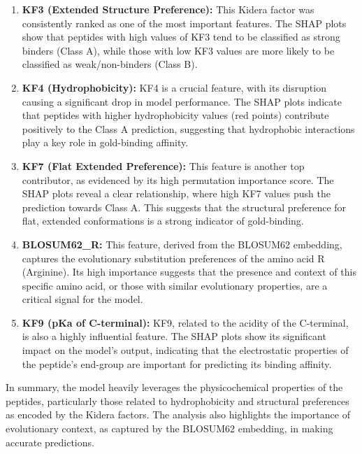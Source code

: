 \documentclass{article}
\begin{document}
\begin{enumerate}
    \item \textbf{KF3 (Extended Structure Preference):} This Kidera factor was consistently ranked as one of the most important features. The SHAP plots show that peptides with high values of KF3 tend to be classified as strong binders (Class A), while those with low KF3 values are more likely to be classified as weak/non-binders (Class B).
    \item \textbf{KF4 (Hydrophobicity):} KF4 is a crucial feature, with its disruption causing a significant drop in model performance. The SHAP plots indicate that peptides with higher hydrophobicity values (red points) contribute positively to the Class A prediction, suggesting that hydrophobic interactions play a key role in gold-binding affinity.
    \item \textbf{KF7 (Flat Extended Preference):} This feature is another top contributor, as evidenced by its high permutation importance score. The SHAP plots reveal a clear relationship, where high KF7 values push the prediction towards Class A. This suggests that the structural preference for flat, extended conformations is a strong indicator of gold-binding.
    \item \textbf{BLOSUM62\_R:} This feature, derived from the BLOSUM62 embedding, captures the evolutionary substitution preferences of the amino acid R (Arginine). Its high importance suggests that the presence and context of this specific amino acid, or those with similar evolutionary properties, are a critical signal for the model.
    \item \textbf{KF9 (pKa of C-terminal):} KF9, related to the acidity of the C-terminal, is also a highly influential feature. The SHAP plots show its significant impact on the model's output, indicating that the electrostatic properties of the peptide's end-group are important for predicting its binding affinity.
\end{enumerate}

In summary, the model heavily leverages the physicochemical properties of the peptides, particularly those related to hydrophobicity and structural preferences as encoded by the Kidera factors. The analysis also highlights the importance of evolutionary context, as captured by the BLOSUM62 embedding, in making accurate predictions.
\end{document}
